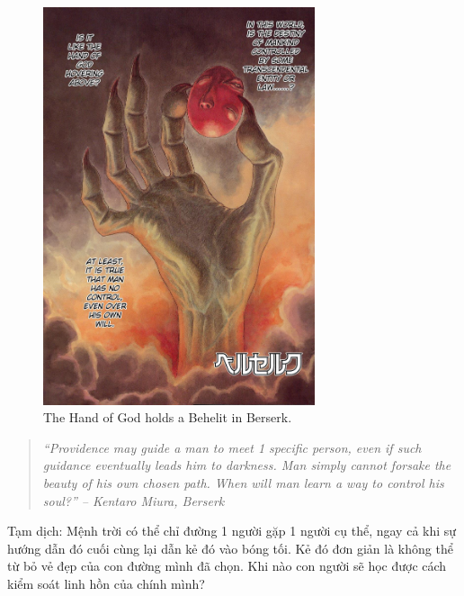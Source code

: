 \documentclass[12pt,oneside]{book}
\begin{document}
\begin{figure}[H]
	\centering
	\includegraphics[width = 8cm]{Berserk_behelit_color}
	\caption{The Hand of God holds a Behelit in Berserk.}
\end{figure}

\begin{quotation}\it
	``Providence may guide a man to meet 1 specific person, even if such guidance eventually leads him to darkness. Man simply cannot forsake the beauty of his own chosen path. When will man learn a way to control his soul?'' -- {\sc Kentaro Miura}, {\it Berserk}
\end{quotation}
{\sf Tạm dịch}: Mệnh trời có thể chỉ đường 1 người gặp 1 người cụ thể, ngay cả khi sự hướng dẫn đó cuối cùng lại dẫn kẻ đó vào bóng tối. Kẻ đó đơn giản là không thể từ bỏ vẻ đẹp của con đường mình đã chọn. Khi nào con người sẽ học được cách kiểm soát linh hồn của chính mình?
	
\end{document}
